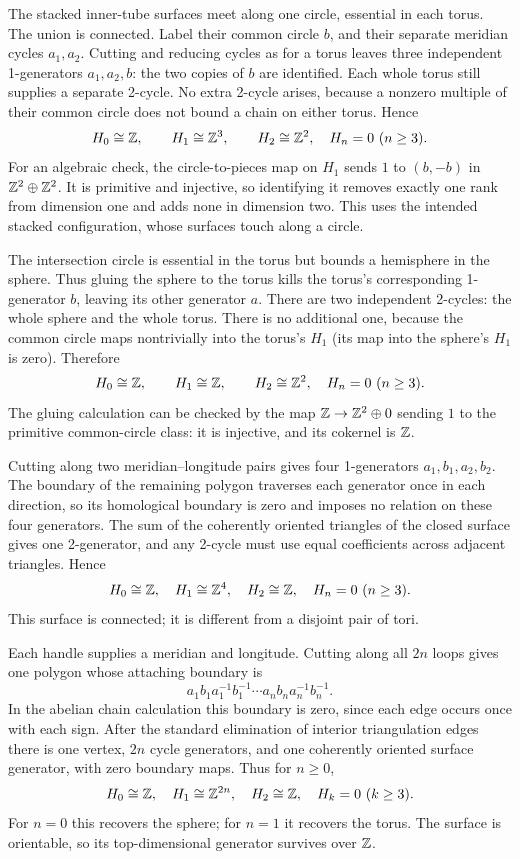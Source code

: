 The stacked inner-tube surfaces meet along one circle, essential in each torus. The union is connected. Label their common circle $b$, and their separate meridian cycles $a_1,a_2$.
Cutting and reducing cycles as for a torus leaves three independent 1-generators $a_1,a_2,b$: the two copies of $b$ are identified. Each whole torus still supplies a separate 2-cycle. No extra 2-cycle arises, because a nonzero multiple of their common circle does not bound a chain on either torus.
Hence
\[
H_0\cong\mathbb{Z},\qquad H_1\cong\mathbb{Z}^3,\qquad H_2\cong\mathbb{Z}^2,
\quad H_n=0\ (n\ge3).
\]
For an algebraic check, the circle-to-pieces map on $H_1$ sends $1$ to $(b,-b)$ in $\mathbb{Z}^2\oplus\mathbb{Z}^2$. It is primitive and injective, so identifying it removes exactly one rank from dimension one and adds none in dimension two. This uses the intended stacked configuration, whose surfaces touch along a circle.

The intersection circle is essential in the torus but bounds a hemisphere in the sphere. Thus gluing the sphere to the torus kills the torus's corresponding 1-generator $b$, leaving its other generator $a$.
There are two independent 2-cycles: the whole sphere and the whole torus. There is no additional one, because the common circle maps nontrivially into the torus's $H_1$ (its map into the sphere's $H_1$ is zero). Therefore
\[
H_0\cong\mathbb{Z},\qquad H_1\cong\mathbb{Z},\qquad H_2\cong\mathbb{Z}^2,
\quad H_n=0\ (n\ge3).
\]
The gluing calculation can be checked by the map $\mathbb{Z}\to\mathbb{Z}^2\oplus0$ sending $1$ to the primitive common-circle class: it is injective, and its cokernel is $\mathbb{Z}$.

Cutting along two meridian--longitude pairs gives four 1-generators $a_1,b_1,a_2,b_2$. The boundary of the remaining polygon traverses each generator once in each direction, so its homological boundary is zero and imposes no relation on these four generators.
The sum of the coherently oriented triangles of the closed surface gives one 2-generator, and any 2-cycle must use equal coefficients across adjacent triangles. Hence
\[
H_0\cong\mathbb{Z},\quad H_1\cong\mathbb{Z}^4,\quad H_2\cong\mathbb{Z},
\quad H_n=0\ (n\ge3).
\]
This surface is connected; it is different from a disjoint pair of tori.

Each handle supplies a meridian and longitude. Cutting along all $2n$ loops gives one polygon whose attaching boundary is
\[
a_1b_1a_1^{-1}b_1^{-1}\cdots a_nb_na_n^{-1}b_n^{-1}.
\]
In the abelian chain calculation this boundary is zero, since each edge occurs once with each sign. After the standard elimination of interior triangulation edges there is one vertex, $2n$ cycle generators, and one coherently oriented surface generator, with zero boundary maps.
Thus for $n\ge0$,
\[
H_0\cong\mathbb{Z},\quad H_1\cong\mathbb{Z}^{2n},\quad H_2\cong\mathbb{Z},
\quad H_k=0\ (k\ge3).
\]
For $n=0$ this recovers the sphere; for $n=1$ it recovers the torus. The surface is orientable, so its top-dimensional generator survives over $\mathbb{Z}$.
